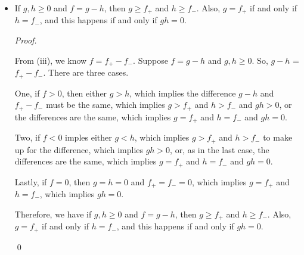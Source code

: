 \documentclass[12pt]{article}
\newenvironment{problem}[2][Problem]{\begin{trivlist}
\item[\hskip \labelsep {\bfseries #1}\hskip \labelsep {\bfseries
#2.}]}{\end{trivlist}}
\newenvironment{sol}
    {\emph{Proof.}
    }
    {
    \qed
    }
\begin{document}
\begin{problem}{48}
\begin{itemize}
    \item[(iv)] If $g,h \geq 0$ and $f = g - h$, then $g \geq f_+$ and $h \geq f_-$. Also, $g = f_+$ if and only if $h = f_-$, and this happens if and only if $gh = 0$.  
    
    \begin{sol}
      From (iii), we know $f = f_+ - f_-$. Suppose $f = g - h$ and $g,h \geq 0$. So, $g - h$ = $f_+ - f_-$. There are three cases. 
      
      \hspace{1em} One, if $f > 0$, then either $g > h$, which implies the difference $g - h$ and $f_+ - f_-$ must be the same, which implies $g > f_+$ and $h > f_-$ and $gh > 0$, or the differences are the same, which implies $g = f_+$ and $h = f_-$ and $gh = 0$. 
      
      \hspace{1em} Two, if $f < 0$ imples either $g < h$, which implies $g > f_+$ and $h > f_-$ to make up for the difference, which implies $gh > 0$, or, as in the last case, the differences are the same, which implies $g = f_+$ and $h = f_-$ and $gh = 0$. 

      \hspace{1em} Lastly, if $f = 0$, then $g = h = 0$ and $f_+ = f_- = 0$, which implies $g = f_+$ and $h = f_-$, which implies $gh = 0$.

      \hspace{1em} Therefore, we have if $g,h \geq 0$ and $f = g - h$, then $g \geq f_+$ and $h \geq f_-$. Also, $g = f_+$ if and only if $h = f_-$, and this happens if and only if $gh = 0$. 
    \end{sol}
  \end{itemize}
\end{problem}
\end{document}
